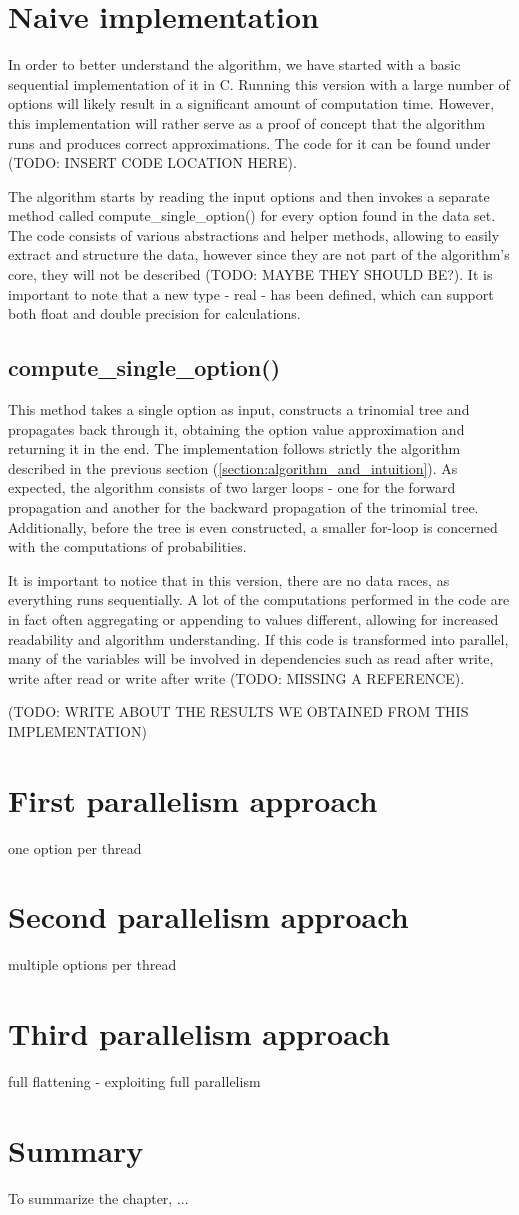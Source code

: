 \section{Naive implementation}
In order to better understand the algorithm, we have started with a basic sequential implementation of it in C. Running this version with a large number of options will likely result in a significant amount of computation time. However, this implementation will rather serve as a proof of concept that the algorithm runs and produces correct approximations. The code for it can be found under (TODO: INSERT CODE LOCATION HERE).

The algorithm starts by reading the input options and then invokes a separate method called compute\_single\_option() for every option found in the data set. The code consists of various abstractions and helper methods, allowing to easily extract and structure the data, however since they are not part of the algorithm's core, they will not be described (TODO: MAYBE THEY SHOULD BE?). It is important to note that a new type - real - has been defined, which can support both float and double precision for calculations. 
\subsection{compute\_single\_option()}
This method takes a single option as input, constructs a trinomial tree and propagates back through it, obtaining the option value approximation and returning it in the end. The implementation follows strictly the algorithm described in the previous section (\ref{section:algorithm_and_intuition}). As expected, the algorithm consists of two larger loops - one for the forward propagation and another for the backward propagation of the trinomial tree. Additionally, before the tree is even constructed, a smaller for-loop is concerned with the computations of probabilities. 
    
It is important to notice that in this version, there are no data races, as everything runs sequentially. A lot of the computations performed in the code are in fact often aggregating or appending to values different, allowing for increased readability and algorithm understanding. If this code is transformed into parallel, many of the variables will be involved in dependencies such as read after write, write after read or write after write (TODO: MISSING A REFERENCE).

(TODO: WRITE ABOUT THE RESULTS WE OBTAINED FROM THIS IMPLEMENTATION)
\section{First parallelism approach}
one option per thread

\section{Second parallelism approach}
multiple options per thread

\section{Third parallelism approach}
full flattening - exploiting full parallelism

\section*{Summary}
To summarize the chapter, ...